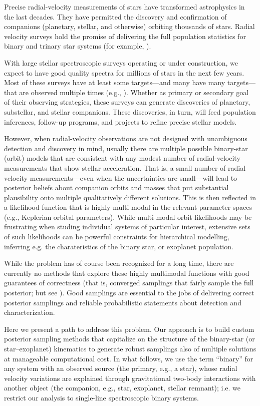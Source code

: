 \documentclass[manuscript, letterpaper]{aastex6}
\begin{document}
Precise radial-velocity measurements of stars have transformed
astrophysics in the last decades.
They have permitted the discovery and confirmation of companions (planetary,
stellar, and otherwise) orbiting thousands of stars.
Radial velocity surveys hold the promise of delivering the full population
statistics for binary and trinary star systems (for example,
\citealt{Raghavan:2010, Tokovinin:2014, Troup:2016}).

With large stellar spectroscopic surveys operating or under
construction, we expect to have good quality spectra for millions
of stars in the next few years.
Most of these surveys have at least some targets---and many have many
targets---that are observed multiple times (e.g., \citealt{Majewski:2015}).
Whether as primary or secondary goal of their observing
strategies, these surveys can generate discoveries of planetary,
substellar, and stellar companions.
These discoveries, in turn, will feed population inferences, follow-up
programs, and projects to refine precise stellar models.

However, when radial-velocity observations are not designed with
unambiguous detection and discovery in mind, usually there are
multiple possible binary-star (orbit) models that are consistent with any
modest number of radial-velocity measurements that show stellar
acceleration.
That is, a small number of radial velocity measurements---even when the
uncertainties are small---will lead to posterior beliefs about companion
orbits and masses that put substantial plausibility onto multiple
qualitatively different solutions.
This is then reflected in a likelihood function that is highly multi-modal in
the relevant parameter spaces (e.g., Keplerian orbital parameters).
While multi-modal orbit likelihoods may be frustrating when studing individual
systems of particular interest, extensive sets of such likelihoods can
be powerful constraints for hierarchical modelling, inferring e.g. the
charateristics of the binary star, or exoplanet population.

While the problem has of course been recognized for a long time, there
are currently no methods that explore these highly multimodal
functions with good guarantees of correctness (that is, converged
samplings that fairly sample the full posterior; but see
\citealt{Brewer:2015}).
Good samplings are essential to the jobs of
delivering correct posterior samplings and reliable probabilistic statements
about detection and characterization.

Here we present a path to address this problem.
Our approach is to build custom posterior sampling methods that capitalize on
the structure of the binary-star (or star--exoplanet) kinematics to generate
robust samplings also of multiple solutions at manageable computational cost.
In what follows, we use the term ``binary'' for any system with an observed
source (the primary, e.g., a star), whose radial velocity variations are
explained through gravitational two-body interactions with another object (the
companion, e.g., star, exoplanet, stellar remnant); i.e. we restrict our
analysis to single-line spectroscopic binary systems.
\end{document}
